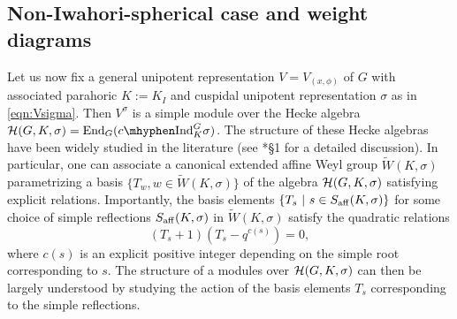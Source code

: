 \subsection{Non-Iwahori-spherical case and weight diagrams}\label{sec:weight_diagram}
Let us now fix a general unipotent representation $V=V_{(x,\phi)}$ of $G$ with associated parahoric $K:=K_I$ and cuspidal unipotent representation $\sigma$ as in \eqref{eqn:Vsigma}. Then $V^\sigma$ is a simple module over the Hecke algebra $\cH(G,K,\sigma)=\End_G(\cInd_K^G\sigma)$. The structure of these Hecke algebras have been widely studied in the literature (see \cite{Lusztig1995}*{\S 1} for a detailed discussion). In particular, one can associate a canonical extended affine Weyl group $\tilde W(K,\sigma)$ parametrizing a basis $\{T_w, w\in \tilde{W}(K,\sigma)\}$ of the algebra $\mathcal{H}(G,K,\sigma)$ satisfying explicit relations. Importantly, the basis elements $\{T_s\ |\ s\in S_{\mathrm{aff}}(K,\sigma)\}$ for some choice of simple reflections $S_{\mathrm{aff}}(K,\sigma)$ in $\tilde{W}(K,\sigma)$ satisfy the quadratic relations
$$(T_s+1)(T_s-q^{c(s)})=0,$$
where $c(s)$ is an explicit positive integer depending on the simple root corresponding to $s$.
The structure of a modules over $\mathcal{H}(G,K,\sigma)$ can then be largely understood by studying the action of the basis elements $T_s$ corresponding to the simple reflections.

